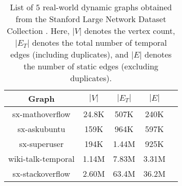 \begin{table}[hbtp]
  \centering
  \caption{List of $5$ real-world dynamic graphs obtained from the Stanford Large Network Dataset Collection \cite{snapnets}. Here, $|V|$ denotes the vertex count, $|E_T|$ denotes the total number of temporal edges (including duplicates), and $|E|$ denotes the number of static edges (excluding duplicates).}
  \label{tab:dataset}
  \begin{tabular}{|c||c|c|c|c|}
    \toprule
    \textbf{Graph} &
    \textbf{\textbf{$|V|$}} &
    \textbf{\textbf{$|E_T|$}} &
    \textbf{\textbf{$|E|$}} \\
    \midrule
    sx-mathoverflow & 24.8K & 507K & 240K \\ \hline
    sx-askubuntu & 159K & 964K & 597K \\ \hline
    sx-superuser & 194K & 1.44M & 925K \\ \hline
    wiki-talk-temporal & 1.14M & 7.83M & 3.31M \\ \hline
    sx-stackoverflow & 2.60M & 63.4M & 36.2M \\ \hline
  \bottomrule
  \end{tabular}
\end{table}
